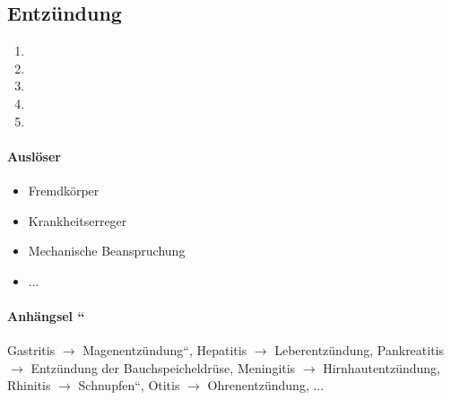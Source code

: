 \subsection{Entz\"undung}


\begin{enumerate}
    \item {}
    \item {}
    \item {}
    \item {}
    \item {}
\end{enumerate}

\paragraph{Ausl\"oser}

\begin{itemize}
    \item Fremdk\"orper
    \item Krankheitserreger
    \item Mechanische Beanspruchung
    \item ...
\end{itemize}

\paragraph{Anh\"angsel
{\textquotedblleft{}}}
Gastritis ${\rightarrow}$
{\quotedblbase}Magenentz\"undung{\textquotedblleft}, Hepatitis
${\rightarrow}$ Leberentz\"undung, Pankreatitis ${\rightarrow}$
Entz\"undung der Bauchspeicheldr\"use, Meningitis ${\rightarrow}$
Hirnhautentz\"undung, Rhinitis ${\rightarrow}$
{\quotedblbase}Schnupfen{\textquotedblleft}, Otitis ${\rightarrow}$
Ohrenentz\"undung, ...

